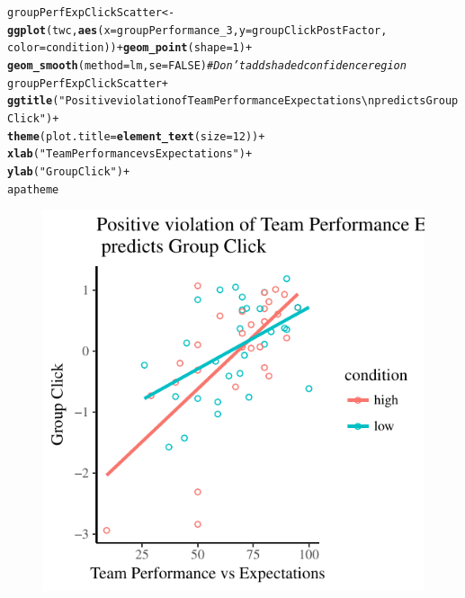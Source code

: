 \documentclass[english]{article}\usepackage[]{graphicx}\usepackage[]{color}
\makeatletter
\def\maxwidth{ %
  \ifdim\Gin@nat@width>\linewidth
    \linewidth
  \else
    \Gin@nat@width
  \fi
}
\newcommand{\hlnum}[1]{\textcolor[rgb]{0.686,0.059,0.569}{#1}}%
\newcommand{\hlstr}[1]{\textcolor[rgb]{0.192,0.494,0.8}{#1}}%
\newcommand{\hlcom}[1]{\textcolor[rgb]{0.678,0.584,0.686}{\textit{#1}}}%
\newcommand{\hlopt}[1]{\textcolor[rgb]{0,0,0}{#1}}%
\newcommand{\hlstd}[1]{\textcolor[rgb]{0.345,0.345,0.345}{#1}}%
\newcommand{\hlkwb}[1]{\textcolor[rgb]{0.69,0.353,0.396}{#1}}%
\newcommand{\hlkwc}[1]{\textcolor[rgb]{0.333,0.667,0.333}{#1}}%
\newcommand{\hlkwd}[1]{\textcolor[rgb]{0.737,0.353,0.396}{\textbf{#1}}}%
\newenvironment{kframe}{%
 \def\at@end@of@kframe{}%
 \ifinner\ifhmode%
  \def\at@end@of@kframe{\end{minipage}}%
  \begin{minipage}{\columnwidth}%
 \fi\fi%
 \def\FrameCommand##1{\hskip\@totalleftmargin \hskip-\fboxsep
 \colorbox{shadecolor}{##1}\hskip-\fboxsep
     \hskip-\linewidth \hskip-\@totalleftmargin \hskip\columnwidth}%
 \MakeFramed {\advance\hsize-\width
   \@totalleftmargin\z@ \linewidth\hsize
   \@setminipage}}%
 {\par\unskip\endMakeFramed%
 \at@end@of@kframe}
\newenvironment{knitrout}{}{} %
\makeatother
\begin{document}
\begin{knitrout}
\color{fgcolor}\begin{kframe}
\begin{alltt}
\hlstd{groupPerfExpClickScatter} \hlkwb{<-} \hlkwd{ggplot}\hlstd{(twc,} \hlkwd{aes}\hlstd{(}\hlkwc{x}\hlstd{=groupPerformance_3,} \hlkwc{y}\hlstd{=groupClickPostFactor,}
                            \hlkwc{color}\hlstd{=condition))} \hlopt{+} \hlkwd{geom_point}\hlstd{(}\hlkwc{shape} \hlstd{=} \hlnum{1}\hlstd{)} \hlopt{+}
                            \hlkwd{geom_smooth}\hlstd{(}\hlkwc{method}\hlstd{=lm,} \hlkwc{se}\hlstd{=}\hlnum{FALSE}\hlstd{)}   \hlcom{# Don't add shaded confidence region}
\hlstd{groupPerfExpClickScatter} \hlopt{+}
            \hlkwd{ggtitle}\hlstd{(}\hlstr{"Positive violation of Team Performance Expectations \textbackslash{}n predicts Group Click"}\hlstd{)} \hlopt{+}
            \hlkwd{theme}\hlstd{(}\hlkwc{plot.title} \hlstd{=} \hlkwd{element_text}\hlstd{(}\hlkwc{size}\hlstd{=}\hlnum{12}\hlstd{))} \hlopt{+}
            \hlkwd{xlab}\hlstd{(}\hlstr{"Team Performance vs Expectations"}\hlstd{)} \hlopt{+}
            \hlkwd{ylab}\hlstd{(}\hlstr{"Group Click"}\hlstd{)} \hlopt{+}
            \hlstd{apatheme}
\end{alltt}


{\ttfamily\noindent\color{warningcolor}{\#\# Warning: Removed 1 rows containing non-finite values (stat\_smooth).}}

{\ttfamily\noindent\color{warningcolor}{\#\# Warning: Removed 1 rows containing missing values (geom\_point).}}\end{kframe}\begin{figure}

{\centering \includegraphics[width=\maxwidth]{figure/teamPerfExpClickScatter-1} 

}

\end{figure}


\end{knitrout}
\end{document}
